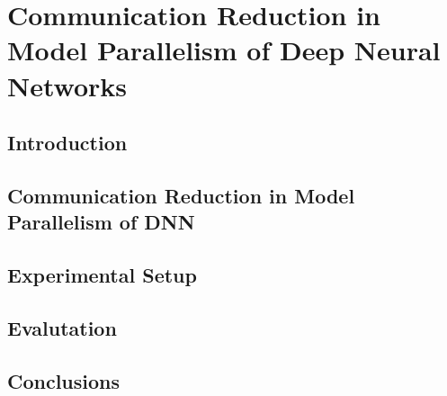 \chapter{Communication Reduction in Model Parallelism of Deep Neural Networks}
\label{chap:altsplit}

\section{Introduction}

\section{Communication Reduction in Model Parallelism of DNN}
\label{sec:altsplit_arch}

\section{Experimental Setup}
\label{sec:altsplit_setup}

\section{Evalutation}
\label{sec:altsplit_evaluation}

\section{Conclusions}
\label{sec:altsplit_conclusion}

